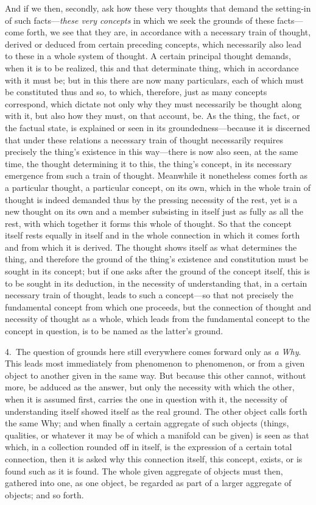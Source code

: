 \documentclass[12pt,a4paper]{book}
\begin{document}
And if we then, secondly, ask how these very thoughts that demand the setting-in of
such facts---\emph{these very concepts} in which we seek the grounds of these
facts---come forth, we see that they are, in accordance with a necessary train of
thought, derived or deduced from certain preceding concepts, which necessarily also
lead to these in a whole system of thought. A certain principal thought demands,
when it is to be realized, this and that determinate thing, which in accordance with
it must be; but in this there are now many particulars, each of which must be
constituted thus and so, to which, therefore, just as many concepts correspond,
which dictate not only why they must necessarily be thought along with it, but also
how they must, on that account, be. As the thing, the fact, or the factual state, is
explained or seen in its groundedness---because it is discerned that under these
relations a necessary train of thought necessarily requires precisely the thing's
existence in this way---there is now also seen, at the same time, the thought
determining it to this, the thing's concept, in its necessary emergence from such a
train of thought. Meanwhile it nonetheless comes forth as a particular thought, a
particular concept, on its own, which in the whole train of thought is indeed
demanded thus by the pressing necessity of the rest, yet is a new thought on its own
and a member subsisting in itself just as fully as all the rest, with which together
it forms this whole of thought. So that the concept itself rests equally in itself
and in the whole connection in which it comes forth and from which it is derived. The
thought shows itself as what determines the thing, and therefore the ground of the
thing's existence and constitution must be sought in its concept; but if one asks
after the ground of the concept itself, this is to be sought in its deduction, in the
necessity of understanding that, in a certain necessary train of thought, leads to
such a concept---so that not precisely the fundamental concept from which one
proceeds, but the connection of thought and necessity of thought as a whole, which
leads from the fundamental concept to the concept in question, is to be named as the
latter's ground.

4.~The question of grounds here still everywhere comes forward only as \emph{a Why}.
This leads most immediately from phenomenon to phenomenon, or from a given object to
another given in the same way. But because this other cannot, without more, be
adduced as the answer, but only the necessity with which the other, when it is
assumed first, carries the one in question with it, the necessity of understanding
itself showed itself as the real ground. The other object calls forth the same Why;
and when finally a certain aggregate of such objects (things, qualities, or whatever
it may be of which a manifold can be given) is seen as that which, in a collection
rounded off in itself, is the expression of a certain total connection, then it is
asked why this connection itself, this concept, exists, or is found such as it is
found. The whole given aggregate of objects must then, gathered into one, as one
object, be regarded as part of a larger aggregate of objects; and so forth.
\end{document}
